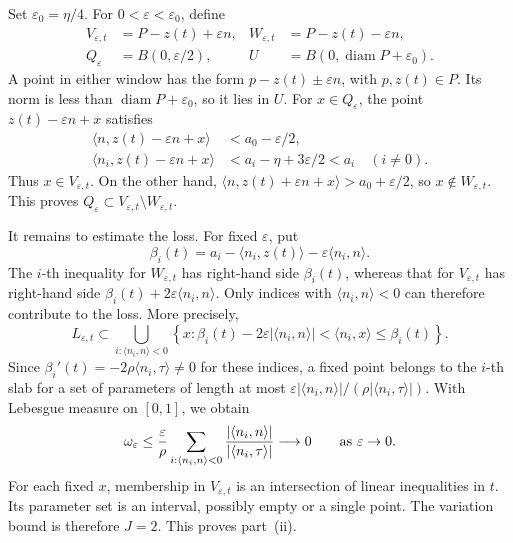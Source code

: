 \documentclass[12pt,reqno,tbtags]{amsart}
\newcommand\inpro[2]{\langle #1,#2\rangle}
\newcommand\1{\mathbbm{1}}
\newcommand{\eps}{\varepsilon}
\begin{document}
Set $\eps_0=\eta/4$. For $0<\eps<\eps_0$, define
\begin{equation}\label{eq:geom-polytope-windows}
    \begin{aligned}
        V_{\eps,t}&=P-z(t)+\eps n,
        &W_{\eps,t}&=P-z(t)-\eps n,\\
        Q_\eps&=B(0,\eps/2),
        &U&=B(0,\operatorname{diam}P+\eps_0).
    \end{aligned}
\end{equation}
A point in either window has the form $p-z(t)\pm\eps n$, with $p,z(t)\in P$.
Its norm is less than $\operatorname{diam}P+\eps_0$, so it lies in $U$. For $x\in Q_\eps$, the point $z(t)-\eps n+x$ satisfies
\begin{equation*}
    \begin{aligned}
        \inpro{n}{z(t)-\eps n+x}&<a_0-\eps/2,\\
        \inpro{n_i}{z(t)-\eps n+x}
        &<a_i-\eta+3\eps/2<a_i\quad(i\ne0).
    \end{aligned}
\end{equation*}
Thus $x\in V_{\eps,t}$. On the other hand,
$\inpro{n}{z(t)+\eps n+x}>a_0+\eps/2$, so $x\notin W_{\eps,t}$.
This proves $Q_\eps\subset V_{\eps,t}\setminus W_{\eps,t}$.

It remains to estimate the loss. For fixed $\eps$, put
\begin{equation*}
    \beta_i(t)=a_i-\inpro{n_i}{z(t)}-\eps\inpro{n_i}{n}.
\end{equation*}
The $i$-th inequality for $W_{\eps,t}$ has right-hand side $\beta_i(t)$,
whereas that for $V_{\eps,t}$ has right-hand side
$\beta_i(t)+2\eps\inpro{n_i}{n}$.
Only indices with $\inpro{n_i}{n}<0$ can therefore contribute to the loss.
More precisely,
\begin{equation}\label{eq:geom-polytope-slabs}
    L_{\eps,t}\subset
    \bigcup_{i:\inpro{n_i}{n}<0}
    \left\{x:
       \beta_i(t)-2\eps|\inpro{n_i}{n}|
       <\inpro{n_i}{x}\le\beta_i(t)\right\}.
\end{equation}
Since $\beta_i'(t)=-2\rho\inpro{n_i}{\tau}\ne0$ for these indices,
a fixed point belongs to the $i$-th slab for a set of parameters of length
at most $\eps|\inpro{n_i}{n}|/(\rho|\inpro{n_i}{\tau}|)$.
With Lebesgue measure on $[0,1]$, we obtain
\begin{equation}\label{eq:geom-polytope-overlap}
    \omega_\eps
    \le\frac\eps\rho
       \sum_{i:\inpro{n_i}{n}<0}
       \frac{|\inpro{n_i}{n}|}{|\inpro{n_i}{\tau}|}
    \longrightarrow0\qquad{\rm{as}}\ \eps\to0.
\end{equation}
For each fixed $x$, membership in $V_{\eps,t}$ is an intersection of
linear inequalities in $t$. Its parameter set is an interval, possibly empty
or a single point. The variation bound is therefore $J=2$.
This proves part~(ii).
\end{document}
